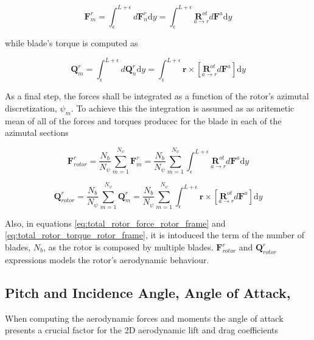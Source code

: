 \begin{equation}
    \mathbf{F}^r_{m} = \int_\epsilon^{L+\epsilon} d\mathbf{F}^r_n \mathrm{d}y = \int_\epsilon^{L+\epsilon} \underset{a \to r}{\boldsymbol{R}^{ot}}  d\mathbf{F}^a \mathrm{d}y
\end{equation}


while blade's torque is computed as

\begin{equation}
    \mathbf{Q}^r_{m} = \int_\epsilon^{L+\epsilon} d\mathbf{Q}^r_n  \mathrm{d}y = \int_\epsilon^{L+\epsilon} \mathbf{r} \times \left[ \underset{a \to r}{\boldsymbol{R}^{ot}}  d\mathbf{F}^a \right] \mathrm{d}y
\end{equation}

As a final step, the forces shall be integrated as a function of the rotor's azimutal discretization, $\psi_m$. To achieve this the integration is assumed as as aritemetic mean of all of the forces and torques producec for the blade in each of the azimutal sections

\begin{equation}
    \mathbf{F}_{rotor}^r = \frac{N_b }{N_{\psi}} \sum_{m=1}^{N_{\psi}} \mathbf{F}^r_{m} = \frac{N_b }{N_{\psi}} \sum_{m=1}^{N_{\psi}} \int_\epsilon^{L+\epsilon} \underset{a \to r}{\boldsymbol{R}^{ot}}  d\mathbf{F}^a \mathrm{d}y
    \label{eq:total_rotor_force_rotor_frame}
\end{equation}

\begin{equation}
    \mathbf{Q}_{rotor}^r = \frac{N_b }{N_{\psi}} \sum_{m=1}^{N_{\psi}} \mathbf{Q}^r_{m} = \frac{N_b }{N_{\psi}} \sum_{m=1}^{N_{\psi}} \int_\epsilon^{L+\epsilon} \mathbf{r} \times \left[ \underset{a \to r}{\boldsymbol{R}^{ot}}  d\mathbf{F}^a \right] \mathrm{d}y
    \label{eq:total_rotor_torque_rotor_frame}
\end{equation}

Also, in equations \ref{eq:total_rotor_force_rotor_frame} and \ref{eq:total_rotor_torque_rotor_frame}, it is intoduced the term of the number of blades, $N_b$, as the rotor is composed by multiple blades. $\mathbf{F}_{rotor}^r$ and $\mathbf{Q}_{rotor}^r$ expressions models the rotor's aerodynamic behaviour.


\subsection{ Pitch and Incidence Angle, Angle of Attack,}

When computing the aerodynamic forces and moments the angle of attack presents a crucial factor for the 2D aerodynamic lift and drag coefficients

